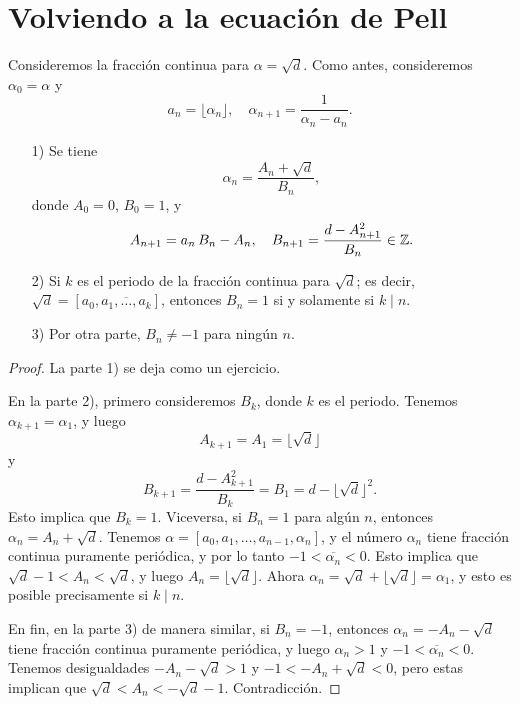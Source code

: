 
\section{Volviendo a la ecuación de Pell}

\begin{lema}
  Consideremos la fracción continua para $\alpha = \sqrt{d}$. Como antes,
  consideremos $\alpha_0 = \alpha$ y
  \[ a_n = \lfloor\alpha_n\rfloor, \quad
     \alpha_{n+1} = \frac{1}{\alpha_n - a_n}. \]

  \begin{enumerate}
  \item[1)] Se tiene
    $$\alpha_n = \frac{A_n + \sqrt{d}}{B_n},$$
    donde $A_0 = 0$, $B_0 = 1$, y
    \[ A_{n+1} = a_n\,B_n - A_n, \quad
       B_{n+1} = \frac{d - A_{n+1}^2}{B_n} \in \mathbb{Z}. \]

  \item[2)] Si $k$ es el periodo de la fracción continua para $\sqrt{d}$;
    es decir, $\sqrt{d} = [a_0, \overline{a_1,\ldots,a_k}]$, entonces
    $B_n = 1$ si y solamente si $k \mid n$.

  \item[3)] Por otra parte, $B_n \ne -1$ para ningún $n$.
  \end{enumerate}

  \begin{proof}
    La parte 1) se deja como un ejercicio.

    En la parte 2), primero consideremos $B_k$, donde $k$ es el periodo.
    Tenemos $\alpha_{k+1} = \alpha_1$, y luego
    $$A_{k+1} = A_1 = \lfloor\sqrt{d}\rfloor$$
    y
    $$B_{k+1} = \frac{d - A_{k+1}^2}{B_k} = B_1 = d - \lfloor\sqrt{d}\rfloor^2.$$
    Esto implica que $B_k = 1$. Viceversa, si $B_n = 1$ para algún $n$, entonces
    $\alpha_n = A_n + \sqrt{d}$. Tenemos
    $\alpha = [a_0,a_1,\ldots,a_{n-1},\alpha_n]$, y el número $\alpha_n$ tiene
    fracción continua puramente periódica, y por lo tanto $-1 <
    \overline{\alpha_n} < 0$. Esto implica que $\sqrt{d} - 1 < A_n < \sqrt{d}$,
    y luego $A_n = \lfloor\sqrt{d}\rfloor$.  Ahora
    $\alpha_n = \sqrt{d} + \lfloor\sqrt{d}\rfloor = \alpha_1$, y esto es posible
    precisamente si $k \mid n$.

    En fin, en la parte 3) de manera similar, si $B_n = -1$, entonces
    $\alpha_n = -A_n - \sqrt{d}$ tiene fracción continua puramente periódica,
    y luego $\alpha_n > 1$ y $-1 < \overline{\alpha_n} < 0$. Tenemos
    desigualdades $-A_n - \sqrt{d} > 1$ y $-1 < -A_n + \sqrt{d} < 0$,
    pero estas implican que $\sqrt{d} < A_n < -\sqrt{d} - 1$. Contradicción.
  \end{proof}
\end{lema}

